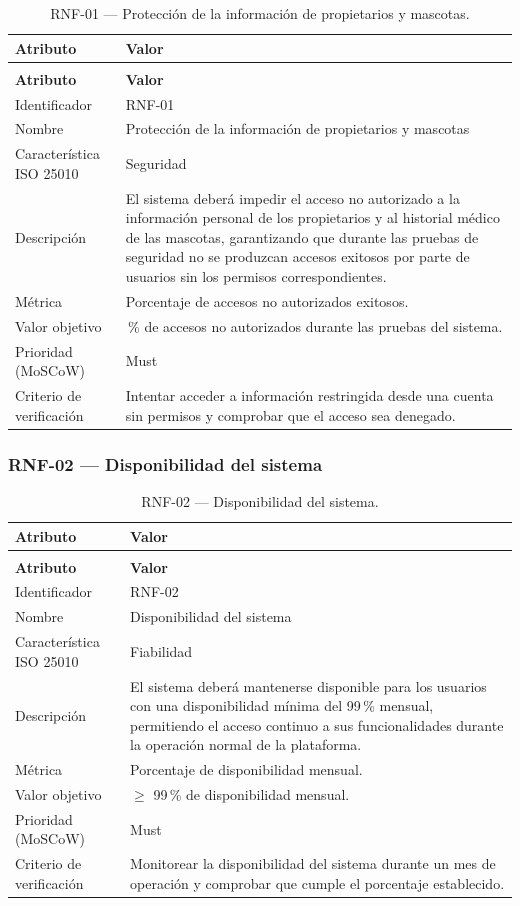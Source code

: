 \documentclass[journal,onecolumn]{IEEEtran}
\makeatletter
\newenvironment{atributos}[2]{%
	\small
	\begin{longtable}{@{}>{\raggedright\arraybackslash}p{4.2cm} >{\raggedright\arraybackslash}p{11.2cm}@{}}
		\caption{#2}\label{tab:#1}\\
		\toprule
		\textbf{Atributo} & \textbf{Valor} \\
		\midrule
		\endfirsthead
		\multicolumn{2}{@{}l}{\small\itshape (continuación)}\\
		\toprule
		\textbf{Atributo} & \textbf{Valor} \\
		\midrule
		\endhead
		\bottomrule
		\endlastfoot
	}{%
	\end{longtable}
	\normalsize
}
\makeatother
\begin{document}
	\begin{atributos}{RNF-01}{RNF-01 --- Protección de la información de propietarios y mascotas.}
		Identificador & RNF-01 \\
		Nombre & Protección de la información de propietarios y mascotas \\
		Característica ISO 25010 & Seguridad \\
		Descripción & El sistema deberá impedir el acceso no autorizado a la información personal de los propietarios y al historial médico de las mascotas, garantizando que durante las pruebas de seguridad no se produzcan accesos exitosos por parte de usuarios sin los permisos correspondientes. \\
		Métrica & Porcentaje de accesos no autorizados exitosos. \\
		Valor objetivo & 0\,\% de accesos no autorizados durante las pruebas del sistema. \\
		Prioridad (MoSCoW) & Must \\
		Criterio de verificación & Intentar acceder a información restringida desde una cuenta sin permisos y comprobar que el acceso sea denegado. \\
	\end{atributos}
	
	\subsubsection{RNF-02 --- Disponibilidad del sistema}
	
	\begin{atributos}{RNF-02}{RNF-02 --- Disponibilidad del sistema.}
		Identificador & RNF-02 \\
		Nombre & Disponibilidad del sistema \\
		Característica ISO 25010 & Fiabilidad \\
		Descripción & El sistema deberá mantenerse disponible para los usuarios con una disponibilidad mínima del 99\,\% mensual, permitiendo el acceso continuo a sus funcionalidades durante la operación normal de la plataforma. \\
		Métrica & Porcentaje de disponibilidad mensual. \\
		Valor objetivo & $\geq$ 99\,\% de disponibilidad mensual. \\
		Prioridad (MoSCoW) & Must \\
		Criterio de verificación & Monitorear la disponibilidad del sistema durante un mes de operación y comprobar que cumple el porcentaje establecido. \\
	\end{atributos}
	
\end{document}
